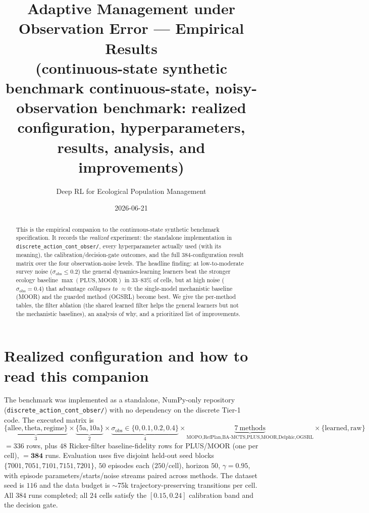 \documentclass[11pt]{article}
\title{Adaptive Management under Observation Error --- Empirical Results\\
\large (continuous-state synthetic benchmark continuous-state, noisy-observation benchmark: realized configuration,
hyperparameters, results, analysis, and improvements)}
\author{Deep RL for Ecological Population Management}
\date{2026-06-21}
\newcommand{\sobs}{\sigma_{\mathrm{obs}}}
\begin{document}
\maketitle

\begin{abstract}
This is the empirical companion to the continuous-state synthetic benchmark specification. It records the
\emph{realized} experiment: the standalone implementation in
\texttt{discrete\_action\_cont\_obser/}, every hyperparameter actually used (with
its meaning), the calibration/decision-gate outcomes, and the full
$384$-configuration result matrix over the four observation-noise levels. The
headline finding: at low-to-moderate survey noise ($\sobs\!\le\!0.2$) the general
dynamics-learning learners beat the stronger ecology baseline
$\max(\text{PLUS},\text{MOOR})$ in $33$--$83\%$ of cells, but at high noise
($\sobs{=}0.4$) that advantage \emph{collapses to $\approx 0$}: the single-model
mechanistic baseline (MOOR) and the guarded method (OGSRL) become best. We give
the per-method tables, the filter ablation (the shared learned filter helps the
general learners but not the mechanistic baselines), an analysis of why, and a
prioritized list of improvements.
\end{abstract}

\section{Realized configuration and how to read this companion}
The benchmark was implemented as a standalone, NumPy-only repository
(\texttt{discrete\_action\_cont\_obser/}) with no dependency on the discrete
Tier-1 code. The executed matrix is
\[
\underbrace{\{\text{allee},\text{theta},\text{regime}\}}_{3}\times
\underbrace{\{5\text{a},10\text{a}\}}_{2}\times
\underbrace{\sobs\in\{0,0.1,0.2,0.4\}}_{4}\times
\underbrace{7\ \text{methods}}_{\text{MOPO,RefPlan,BA-MCTS,PLUS,MOOR,Delphic,OGSRL}}\times
\{\text{learned},\text{raw}\}
\]
$=336$ rows, plus $48$ Ricker-filter baseline-fidelity rows for PLUS/MOOR
(one per cell), $=\mathbf{384}$ runs. Evaluation uses five disjoint held-out seed
blocks $\{7001,7051,7101,7151,7201\}$, $50$ episodes each ($250$/cell), horizon
$50$, $\gamma{=}0.95$, with episode parameters/starts/noise streams paired across
methods. The dataset seed is $116$ and the data budget is $\sim$75k
trajectory-preserving transitions per cell. All $384$ runs completed; all $24$
cells satisfy the $[0.15,0.24]$ calibration band and the decision gate.
\end{document}
